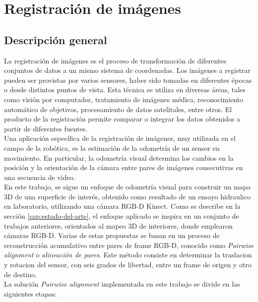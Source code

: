 	 	 	

\chapter{Registración de imágenes}

\section{Descripción general}
\label{sec:descripcion-general-registracion}

La registración de imágenes es el proceso de transformación de diferentes conjuntos de datos a un mismo sistema de coordenadas. Los imágenes a registrar pueden ser provistas por varios sensores, haber sido tomadas en diferentes épocas o desde distintos puntos de vista. Esta técnica se utiliza en diversas áreas, tales como visión por computador, tratamiento de imágenes médica, reconocimiento automático de objetivos, procesamiento de datos satelitales, entre otros. El producto de la registración permite comparar o integrar los datos obtenidos a partir de diferentes fuentes. \\
Una aplicación específica de la registración de imágenes, muy utilizada en el campo de la robótica, es la estimación de la odometría de un sensor en movimiento. En particular, la odometría visual determina los cambios en la posición y la orientación de la cámara entre pares de imágenes consecutivas en una secuencia de video. \\
En este trabajo, se sigue un enfoque de odometría visual para construir un mapa 3D de una superficie de interés, obtenido como resultado de un ensayo hidraulico en laboratorio, utilizando una cámara RGB-D Kinect. Como se describe en la sección \ref{cap:estado-del-arte}, el enfoque aplicado se inspira en un conjunto de trabajos anteriores, orientados al mapeo 3D de interiores, donde emplearon cámaras RGB-D. Varias de estas propuestas se basan en un proceso de reconstrucción acumulativo entre pares de frame RGB-D, conocido como \textit{Pairwise alignment} o \textit{alineación de pares}. Este método consiste en determinar la traslacion y rotacion del sensor, con seis grados de libertad, entre un frame de origen y otro de destino. \\
La solución \textit{Pairwise alignment} implementada en este trabajo se divide en las siguientes etapas:
